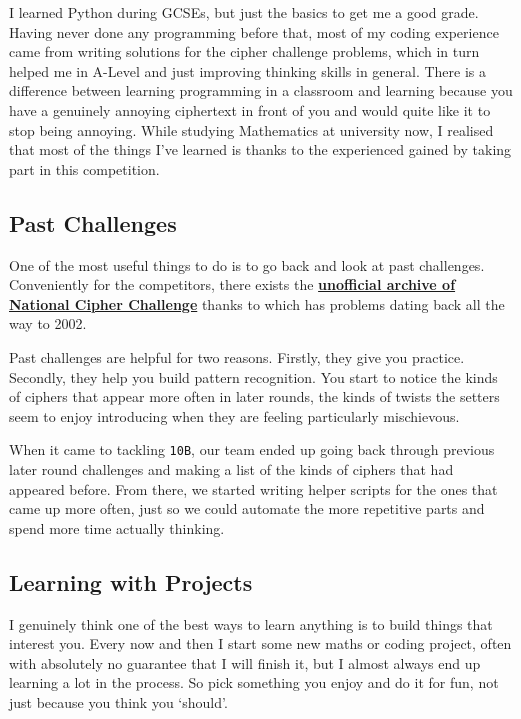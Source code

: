 I learned Python during GCSEs, but just the basics to get me a good grade. Having never done any programming before that, most of my coding experience came from writing solutions for the cipher challenge problems, which in turn helped me in A-Level and just improving thinking skills in general. There is a difference between learning programming in a classroom and learning because you have a genuinely annoying ciphertext in front of you and would quite like it to stop being annoying. While studying Mathematics at university now, I realised that most of the things I’ve learned is thanks to the experienced gained by taking part in this competition.  

\subsection{Past Challenges}

One of the most useful things to do is to go back and look at past challenges. Conveniently for the competitors, there exists the \textbf{\href{https://github.com/themaddoctor/BritishNationalCipherChallenge}{unofficial archive of National Cipher Challenge}} thanks to  which has problems dating back all the way to 2002. 

Past challenges are helpful for two reasons. Firstly, they give you practice. Secondly, they help you build pattern recognition. You start to notice the kinds of ciphers that appear more often in later rounds, the kinds of twists the setters seem to enjoy introducing when they are feeling particularly mischievous.

When it came to tackling \texttt{10B}, our team ended up going back through previous later round challenges and making a list of the kinds of ciphers that had appeared before. From there, we started writing helper scripts for the ones that came up more often, just so we could automate the more repetitive parts and spend more time actually thinking.

\subsection{Learning with Projects}

I genuinely think one of the best ways to learn anything is to build things that interest you. Every now and then I start some new maths or coding project, often with absolutely no guarantee that I will finish it, but I almost always end up learning a lot in the process. So pick something you enjoy and do it for fun, not just because you think you `should'.

